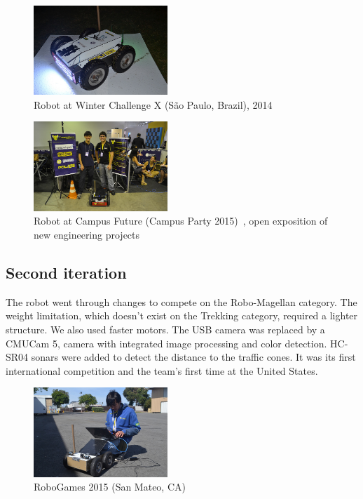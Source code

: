 \documentclass[conference]{IEEEtran}
\begin{document}
\begin{figure}[H]
    \centering
    \includegraphics[width=0.45\textwidth]{../Pictures/v1/WCX2014/14749170673_6e4bfca9fc_z.jpg}
    \caption{Robot at Winter Challenge X (São Paulo, Brazil), 2014}
\end{figure}

\begin{figure}[H]
    \centering
    \includegraphics[width=0.45\textwidth]{../Pictures/v1/URC2014/16907969931_064dda21f8_z.jpg}
    \caption{Robot at Campus Future (Campus Party 2015)~\cite{Campus-Future},
    open exposition of new engineering projects}
\end{figure}

\subsection{Second iteration}
The robot went through changes to compete on the Robo-Magellan category.
The weight limitation, which doesn't exist on the Trekking category, required
a lighter structure. We also used faster motors.
The USB camera was replaced by a CMUCam 5, camera with integrated image
processing and color detection. HC-SR04 sonars were added to detect the
distance to the traffic cones.
It was its first international competition and the team's first time at the
United States.

\begin{figure}[H]
    \centering
    \includegraphics[width=0.45\textwidth]{../Pictures/v2/RG2015/16982466210_3565d58788_z.jpg}
    \caption{RoboGames 2015 (San Mateo, CA)}
\end{figure}
\end{document}
